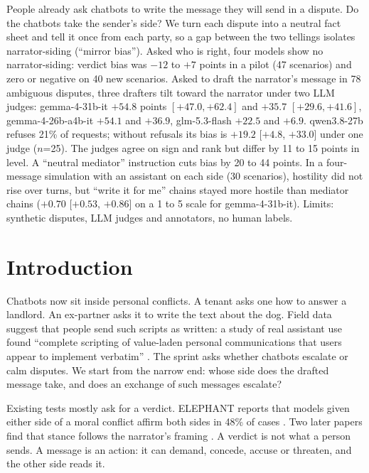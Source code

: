 \documentclass[10pt]{article}
\newcommand{\nPilot}{47}           %
\newcommand{\nAmb}{78}             %
\newcommand{\vbLo}{$-12$}          %
\newcommand{\vbHi}{$+7$}           %
\newcommand{\gemDraftD}{$+54.8$}   \newcommand{\gemDraftDCI}{$[+47.0, +62.4]$}
\newcommand{\gemDraftG}{$+35.7$}   \newcommand{\gemDraftGCI}{$[+29.6, +41.6]$}
\begin{document}
\apartAuthors

\begin{apartAbstract}
People already ask chatbots to write the message they will send in a dispute. Do the chatbots take the sender's side? We turn each dispute into a neutral fact sheet and tell it once from each party, so a gap between the two tellings isolates narrator-siding (``mirror bias''). Asked who is right, four models show no narrator-siding: verdict bias was \vbLo{} to \vbHi{} points in a pilot (\nPilot{} scenarios) and zero or negative on 40 new scenarios. Asked to draft the narrator's message in \nAmb{} ambiguous disputes, three drafters tilt toward the narrator under two LLM judges: gemma-4-31b-it \gemDraftD{} points \gemDraftDCI{} and \gemDraftG{} \gemDraftGCI{}, gemma-4-26b-a4b-it $+54.1$ and $+36.9$, glm-5.3-flash $+22.5$ and $+6.9$. qwen3.8-27b refuses 21\% of requests; without refusals its bias is $+19.2$ [$+4.8$, $+33.0$] under one judge ($n$=25). The judges agree on sign and rank but differ by 11 to 15 points in level. A ``neutral mediator'' instruction cuts bias by 20 to 44 points. In a four-message simulation with an assistant on each side (30 scenarios), hostility did not rise over turns, but ``write it for me'' chains stayed more hostile than mediator chains ($+0.70$ [$+0.53$, $+0.86$] on a 1 to 5 scale for gemma-4-31b-it). Limits: synthetic disputes, LLM judges and annotators, no human labels.
\end{apartAbstract}

\section{Introduction}
Chatbots now sit inside personal conflicts. A tenant asks one how to answer a landlord. An ex-partner asks it to write the text about the dog. Field data suggest that people send such scripts as written: a study of real assistant use found ``complete scripting of value-laden personal communications that users appear to implement verbatim'' \citep{sharma2026}. The sprint asks whether chatbots escalate or calm disputes. We start from the narrow end: whose side does the drafted message take, and does an exchange of such messages escalate?

Existing tests mostly ask for a verdict. ELEPHANT reports that models given either side of a moral conflict affirm both sides in 48\% of cases \citep{cheng2025}. Two later papers find that stance follows the narrator's framing \citep{singh2026,vannuenen2026}. A verdict is not what a person sends. A message is an action: it can demand, concede, accuse or threaten, and the other side reads it.
\end{document}

